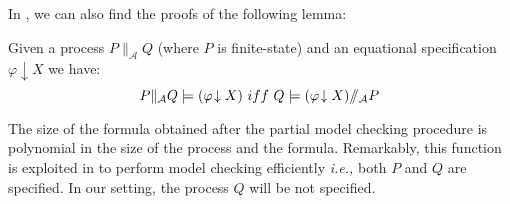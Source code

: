 \documentclass{entcs}
\newcommand{\ie}{\emph{i.e., }}
\newcommand{\sse}{{\rm\ iff\ }}
\newcommand{\quotres}[2]{\slash\!\!\slash_{#1} #2}
\newcommand{\frecciagiu}{\! \downarrow}
\newcommand{\alphaset}{\mathcal{A}}
\newcommand{\pdcres}[1]{\|_{#1}}
\begin{document}
In \cite{IB-B941065,LICS::Andersen1995,nielsen},  we can also find the
proofs of the following lemma:%

\begin{lemma}
\label{lemmapar}
Given a process $P \pdcres{\alphaset} Q$ (where $P$ is finite-state)
and an equational specification $\varphi \frecciagiu\! X$ we have: $$P
\pdcres{\alphaset} Q \models (\varphi \frecciagiu X) \sse Q \models
(\varphi \frecciagiu X)\quotres{\cal A}{P}$$
\end{lemma}%

The size of the formula obtained after the partial model checking
procedure is polynomial in the size of the process and the formula.
Remarkably, this function is  exploited in \cite{LICS::Andersen1995}
to perform model checking efficiently \ie both $P$ and $Q$ are
specified.  In our setting, the process $Q$ will be not specified.
\end{document}
